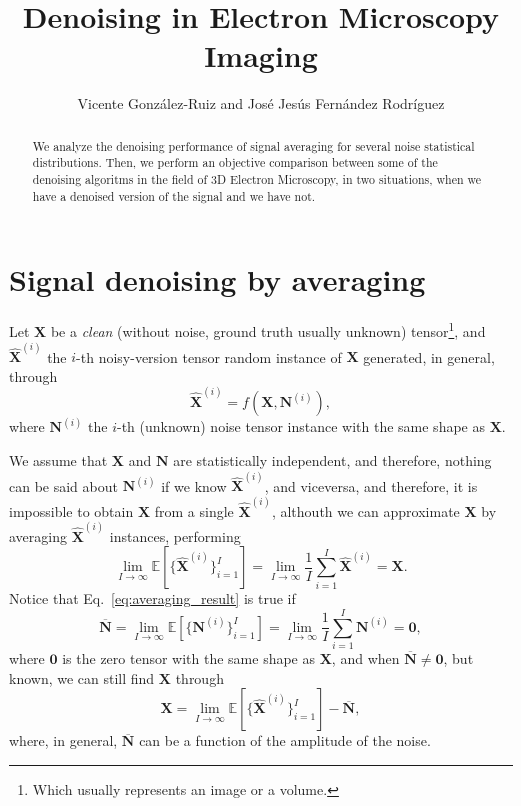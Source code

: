 \documentclass{article}
\title{Denoising in Electron Microscopy Imaging}
\author{Vicente González-Ruiz and José Jesús Fernández Rodríguez}
\begin{document}
\maketitle

\begin{abstract}
  We analyze the denoising performance of signal averaging for several
  noise statistical distributions. Then, we perform an objective
  comparison between some of the denoising algoritms in the field
  of 3D Electron Microscopy, in two situations, when we have a
  denoised version of the signal and we have not.
\end{abstract}

\section{Signal denoising by averaging}
Let $\mathbf{X}$ be a \emph{clean} (without noise, ground truth
usually unknown) tensor\footnote{Which usually represents an image or
  a volume.}, and $\hat{\mathbf X}^{(i)}$ the $i$-th noisy-version
tensor random instance of $\mathbf{X}$ generated, in general, through
\begin{equation}
  \hat{\mathbf X}^{(i)} = f(\mathbf{X}, \mathbf{N}^{(i)}),
  \label{eq:general_model}
\end{equation}
where ${\mathbf N}^{(i)}$ the $i$-th (unknown) noise tensor instance
with the same shape as $\mathbf{X}$.

We assume that ${\mathbf X}$ and $\mathbf{N}$ are statistically
independent, and therefore, nothing can be said about
${\mathbf N}^{(i)}$ if we know $\hat{\mathbf X}^{(i)}$, and
viceversa, and therefore, it is impossible to obtain ${\mathbf X}$
from a single $\hat{\mathbf X}^{(i)}$, althouth we can approximate ${\mathbf X}$ by
averaging $\hat{\mathbf X}^{(i)}$ instances, performing
\begin{equation}
  \lim_{I \to \infty} \mathbb{E}\left[\{\hat{\mathbf X}^{(i)}\}_{i=1}^I\right] = \lim_{I \to \infty} \frac{1}{I} \sum_{i=1}^I \hat{\mathbf X}^{(i)} = {\mathbf X}.
  \label{eq:averaging_result}
\end{equation}
Notice that Eq.~\ref{eq:averaging_result} is true if 
\begin{equation}
  \overline{\mathbf N} = \lim_{I \to \infty}{\mathbb E}[\{{\mathbf N^{(i)}}\}_{i=1}^I]=\lim_{I \to \infty}\frac{1}{I} \sum_{i=1}^I {\mathbf N}^{(i)}={\mathbf 0},
  \label{eq:noise_expectation_2}
\end{equation}
where ${\mathbf 0}$ is the zero tensor with the same shape as
$\mathbf{X}$, and when $\overline{\mathbf N}\ne {\mathbf 0}$, but
known, we can still find ${\mathbf X}$ through
\begin{equation}
  {\mathbf X} = \lim_{I \to \infty} \mathbb{E}\left[\{\hat{\mathbf X}^{(i)}\}_{i=1}^I\right]  - \overline{\mathbf N},
  \label{eq:averaging_result_with_bias}
\end{equation}
where, in general, $\overline{\mathbf N}$ can be a function of the amplitude of the noise. 
\end{document}

